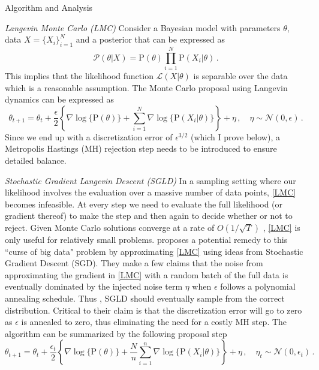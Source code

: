 \documentclass{article}
\renewcommand{\Pr}[1]{\mbox{P}\!\left(#1\right)}
\begin{document}
\begin{section}{Algorithm and Analysis}
\begin{subsection}{\it Langevin Monte Carlo (LMC)}
Consider a Bayesian model with parameters $\theta$, data $X=\{X_i\}_{i=1}^N$ and a posterior that can be expressed as 
\begin{equation}
\mathcal{P}(\theta | X) = \Pr{\theta}{}\prod_{i=1}^N \Pr{X_i | \theta}{} \,. \label{post}
\end{equation}
This implies that the likelihood function $\mathcal{L}(X | \theta)$ is separable over the data which is a reasonable assumption.  The Monte Carlo proposal using Langevin dynamics can be expressed as
\begin{equation}
\theta_{t+1} = \theta_t + \frac{\epsilon}{2}\left\{\nabla \log\{\Pr{\theta}\} +  \sum_{i=1}^N \nabla \log\{ \Pr{X_i | \theta}\}\right\}+ \eta\,, \quad \eta \sim \mathcal{N}(0,\epsilon) \,. \label{LMC}
\end{equation}
Since we end up with a discretization error of $\epsilon^{3/2}$ (which I prove below), a Metropolis Hastings (MH) rejection step needs to be introduced to ensure detailed balance.
\end{subsection}
\begin{subsection}{\it Stochastic Gradient Langevin Descent (SGLD)}
In a sampling setting where our likelihood involves the evaluation over a massive number of data points, \eqref{LMC} becomes infeasible.  At every step we need to evaluate the full likelihood (or gradient thereof) to make the step and then again to decide whether or not to reject.  Given Monte Carlo solutions converge at a rate of $O(1/\sqrt{T})$ \cite{Liu01}, \eqref{LMC} is only useful for relatively small problems.  \cite{WelTeh2011a} proposes a potential remedy to this ``curse of big data" problem by approximating \eqref{LMC} using ideas from Stochastic Gradient Descent (SGD).  They make a few claims that the noise from approximating the gradient in \eqref{LMC} with a random batch of the full data is eventually dominated by the injected noise term $\eta$ when $\epsilon$ follows a polynomial annealing schedule. Thus , SGLD should eventually sample from the correct distribution.  Critical to their claim is that the discretization error will go to zero as $\epsilon$ is annealed to zero, thus eliminating the need for a costly MH step.  The algorithm can be summarized by the following proposal step
\begin{equation}
\theta_{t+1} = \theta_t + \frac{\epsilon_t}{2}\left\{\nabla \log\{\Pr{\theta}\} +  \frac{N}{n}\sum_{i=1}^n \nabla \log\{ \Pr{X_i | \theta}\}\right\}+ \eta\,, \quad \eta_t \sim \mathcal{N}(0,\epsilon_t) \,. \label{SGLD}

\end{equation}
\end{subsection}
\end{section}
\end{document}
